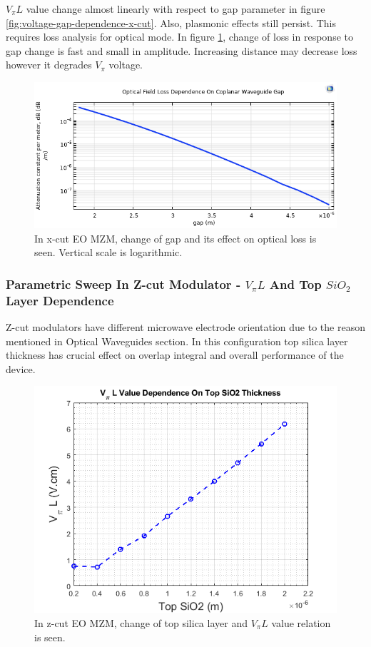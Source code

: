     \newpage
    
    $V_\pi L$ value change almost linearly with respect to gap parameter in figure \ref{fig:voltage-gap-dependence-x-cut}. Also, plasmonic effects still persist. This requires loss analysis for optical mode. In figure \ref{fig:x-cut-gap-loss}, change of loss in response to gap change is fast and small in amplitude. Increasing distance may decrease loss however it degrades $V_\pi$ voltage. 
    
    \begin{figure}[h]
        \centering
        \includegraphics[width=0.75\linewidth]{xCut Loss vs gap change.png}
        \caption{In x-cut EO MZM, change of gap and its effect on optical loss is seen. Vertical scale is logarithmic.}
        \label{fig:x-cut-gap-loss}
    \end{figure}
    
    \subsubsection{Parametric Sweep In Z-cut Modulator - $V_\pi L$ And Top $SiO_2$ Layer Dependence}

    Z-cut modulators have different microwave electrode orientation due to the reason mentioned in Optical Waveguides section. In this configuration top silica layer thickness has crucial effect on overlap integral and overall performance of the device. 

    \begin{figure}[h]
        \centering
        \includegraphics[width=0.75\linewidth]{overlap_integral_updated_2nd_neff_without voltage selection.png}
        \caption{In z-cut EO MZM, change of top silica layer and $V_\pi L$ value relation is seen.}
        \label{fig:voltage-thickness-dependence-z-cut}
    \end{figure}

